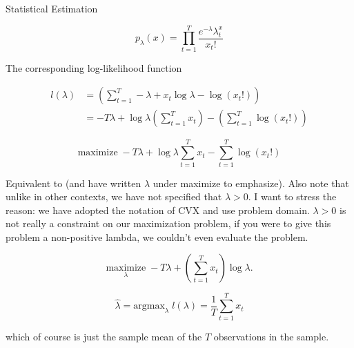 \begin{chapter}{Statistical Estimation}
    
    \[p_{\lambda}(x) = \prod_{t=1}^{T}\frac{e^{-\lambda}\lambda^x_{t}}{x_t!}\]

    The corresponding log-likelihood function

    \[\begin{aligned}
        l(\lambda) &= \left(\sum_{t=1}^{T} -\lambda + x_t \log \lambda - \log(x_t!) \right) \\
        &= -T\lambda + \log \lambda \left(\sum_{t=1}^{T}x_t  \right) - \left( \sum_{t=1}^{T} \log (x_t!) \right)
    \end{aligned}\]

    \[\text{maximize} \; -T \lambda + \log \lambda \sum_{t=1}^{T}x_t - \sum_{t=1}^{T}\log(x_t!) \]

    Equivalent to (and have written $\lambda$ under maximize to emphasize). Also note that unlike in other contexts,
    we have not specified that $\lambda > 0$. I want to stress the reason: we have adopted the notation of CVX 
    and use problem domain. $\lambda > 0$ is not really a constraint on our maximization problem, if you were to 
    give this problem a non-positive lambda, we couldn't even evaluate the problem.

    \[ \underset{\lambda}{\text{maximize}}  \; -T\lambda + \left( \sum_{t=1}^{T}x_t \right)\log \lambda.\]

    \[\hat{\lambda} = \text{argmax}_{\lambda} \; l(\lambda) = \frac{1}{T}\sum_{t=1}^{T}x_t\]

    which of course is just the sample mean of the $T$ observations in the sample.


\end{chapter}